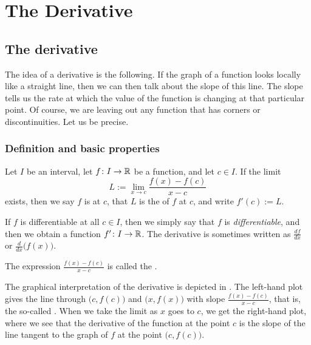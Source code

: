 \chapter{The Derivative} \label{der:chapter}


\section{The derivative}
\label{sec:der}


The idea of a derivative is the following.
If the graph of a function looks locally like a straight line,
then we can then talk about the slope of this line.
The slope tells us the rate at which 
the value of the function is changing at that particular point.
Of course, we are leaving out any function that has corners or
discontinuities.  Let us be precise.

\subsection{Definition and basic properties}

\begin{defn}
Let $I$ be an interval, let
$f \colon I \to {\mathbb{R}}$ be a function, and let $c \in I$.  If 
the limit
\begin{equation*}
L := \lim_{x \to c} \frac{f(x)-f(c)}{x-c} 
\end{equation*}
exists, then we say $f$ is
\emph{} at
$c$, that $L$ is the \emph{} of $f$ at $c$,
and write $f'(c) := L$.

\medskip

If $f$ is differentiable at all $c \in I$, then we simply say that
$f$ is \emph{differentiable}, and then we obtain a function
$f' \colon I \to {\mathbb{R}}$.
The derivative is sometimes written as $\frac{df}{dx}$ or
$\frac{d}{dx}\bigl( f(x) \bigr)$.

\medskip

The expression $\frac{f(x)-f(c)}{x-c}$ is called the
\emph{}.
\end{defn}

The graphical interpretation of the derivative is  depicted in
.  The left-hand plot gives the line through
$\bigl(c,f(c)\bigr)$
and $\bigl(x,f(x)\bigr)$ with slope
$\frac{f(x)-f(c)}{x-c}$, that is,
the so-called \emph{}.  When we take the limit as $x$ goes to $c$,
we get the right-hand plot, where we see
that the derivative of the function
at the point $c$ is the slope of the line tangent to the graph of $f$
at the point $\bigl(c,f(c)\bigr)$.

